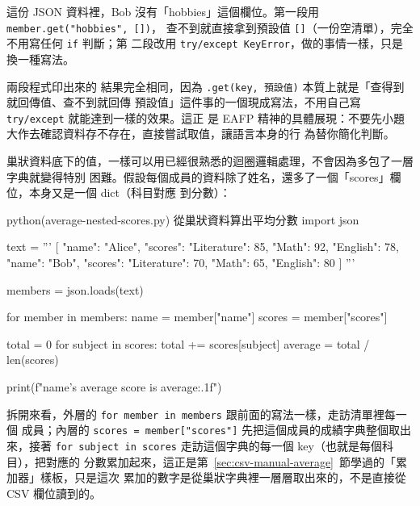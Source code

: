 
這份 JSON 資料裡，Bob 沒有「hobbies」這個欄位。第一段用 \texttt{member.get("hobbies", [])}，
查不到就直接拿到預設值 \texttt{[]}（一份空清單），完全不用寫任何 \texttt{if} 判斷；第
二段改用 \texttt{try/except KeyError}，做的事情一樣，只是換一種寫法。

兩段程式印出來的
結果完全相同，因為 \texttt{.get(key, 預設值)} 本質上就是「查得到就回傳值、查不到就回傳
預設值」這件事的一個現成寫法，不用自己寫 \texttt{try/except} 就能達到一樣的效果。這正
是 EAFP 精神的具體展現：不要先小題大作去確認資料存不存在，直接嘗試取值，讓語言本身的行
為替你簡化判斷。

巢狀資料底下的值，一樣可以用已經很熟悉的迴圈邏輯處理，不會因為多包了一層字典就變得特別
困難。假設每個成員的資料除了姓名，還多了一個「scores」欄位，本身又是一個 dict（科目對應
到分數）：

\begin{example}{python}{(average-nested-scores.py) 從巢狀資料算出平均分數}
import json

text = '''
[
    {"name": "Alice", "scores": {"Literature": 85, "Math": 92, "English": 78}},
    {"name": "Bob", "scores": {"Literature": 70, "Math": 65, "English": 80}}
]
'''

members = json.loads(text)

for member in members:
    name = member["name"]
    scores = member["scores"]

    total = 0
    for subject in scores:
        total += scores[subject]
    average = total / len(scores)

    print(f"{name}'s average score is {average:.1f}")
\end{example}


拆開來看，外層的 \texttt{for member in members} 跟前面的寫法一樣，走訪清單裡每一個
成員；內層的 \texttt{scores = member["scores"]} 先把這個成員的成績字典整個取出來，接著
\texttt{for subject in scores} 走訪這個字典的每一個 key（也就是每個科目），把對應的
分數累加起來，這正是第~\ref{sec:csv-manual-average}~節學過的「累加器」樣板，只是這次
累加的數字是從巢狀字典裡一層層取出來的，不是直接從 CSV 欄位讀到的。

